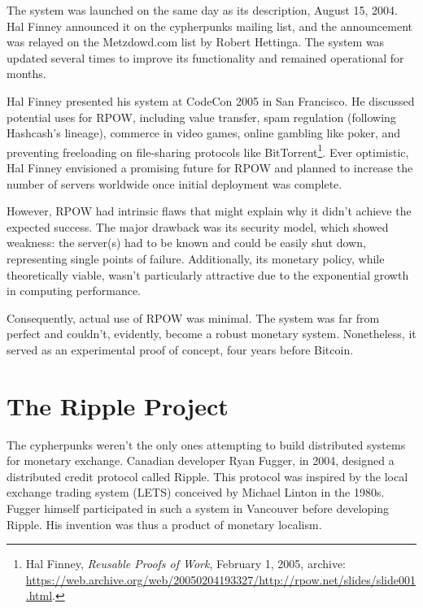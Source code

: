 \documentclass[
  a5paper,
  smalldemyvopaper,10pt,twoside,onecolumn,openright,extrafontsizes,hidelinks]{memoir}
\begin{document}
The system was launched on the same day as its description, August 15,
2004. Hal Finney announced it on the cypherpunks mailing list, and the
announcement was relayed on the Metzdowd.com list by Robert Hettinga.
The system was updated several times to improve its functionality and
remained operational for months.

Hal Finney presented his system at CodeCon 2005 in San Francisco. He
discussed potential uses for RPOW, including value transfer, spam
regulation (following Hashcash's lineage), commerce in video games,
online gambling like poker, and preventing freeloading on file-sharing
protocols like BitTorrent\footnote{Hal Finney, \emph{Reusable Proofs of
  Work}, February 1, 2005, archive:
  \url{https://web.archive.org/web/20050204193327/http://rpow.net/slides/slide001.html}.}.
Ever optimistic, Hal Finney envisioned a promising future for RPOW and
planned to increase the number of servers worldwide once initial
deployment was complete.

However, RPOW had intrinsic flaws that might explain why it didn't
achieve the expected success. The major drawback was its security model,
which showed weakness: the server(s) had to be known and could be easily
shut down, representing single points of failure. Additionally, its
monetary policy, while theoretically viable, wasn't particularly
attractive due to the exponential growth in computing performance.

Consequently, actual use of RPOW was minimal. The system was far from
perfect and couldn't, evidently, become a robust monetary system.
Nonetheless, it served as an experimental proof of concept, four years
before Bitcoin.

\section*{The Ripple Project}\label{the-ripple-project}


The cypherpunks weren't the only ones attempting to build distributed
systems for monetary exchange. Canadian developer Ryan Fugger, in 2004,
designed a distributed credit protocol called Ripple. This protocol was
inspired by the local exchange trading system (LETS) conceived by
Michael Linton in the 1980s. Fugger himself participated in such a
system in Vancouver before developing Ripple. His invention was thus a
product of monetary localism.
\end{document}
